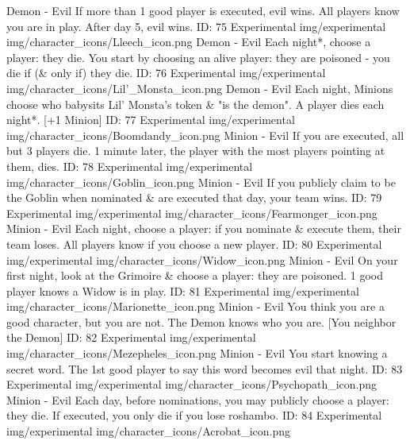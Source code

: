 	{\color{evilcolor}Demon - Evil}
	{If more than 1 good player is executed, evil wins. All players know you are in play. After day 5, evil wins.}        
	{ID: 75}
	{Experimental}
	{img/experimental}
	{img/character_icons/Lleech_icon.png}
	{\color{evilcolor}Demon - Evil}
	{Each night*, choose a player: they die. You start by choosing an alive player: they are poisoned - you die if (\& only if) they die.}        
	{ID: 76}
	{Experimental}
	{img/experimental}
	{img/character_icons/Lil'_Monsta_icon.png}
	{\color{evilcolor}Demon - Evil}
	{Each night, Minions choose who babysits Lil' Monsta's token \& "is the demon". A player dies each night*. [+1 Minion]}        
	{ID: 77}
	{Experimental}
	{img/experimental}
	{img/character_icons/Boomdandy_icon.png}
	{\color{evilcolor}Minion - Evil}
	{If you are executed, all but 3 players die. 1 minute later, the player with the most players pointing at them, dies.}        
	{ID: 78}
	{Experimental}
	{img/experimental}
	{img/character_icons/Goblin_icon.png}
	{\color{evilcolor}Minion - Evil}
	{If you publicly claim to be the Goblin when nominated \& are executed that day, your team wins.}        
	{ID: 79}
	{Experimental}
	{img/experimental}
	{img/character_icons/Fearmonger_icon.png}
	{\color{evilcolor}Minion - Evil}
	{Each night, choose a player: if you nominate \& execute them, their team loses. All players know if you choose a new player.}        
	{ID: 80}
	{Experimental}
	{img/experimental}
	{img/character_icons/Widow_icon.png}
	{\color{evilcolor}Minion - Evil}
	{On your first night, look at the Grimoire \& choose a player: they are poisoned. 1 good player knows a Widow is in play.}        
	{ID: 81}
	{Experimental}
	{img/experimental}
	{img/character_icons/Marionette_icon.png}
	{\color{evilcolor}Minion - Evil}
	{You think you are a good character, but you are not. The Demon knows who you are. [You neighbor the Demon]}        
	{ID: 82}
	{Experimental}
	{img/experimental}
	{img/character_icons/Mezepheles_icon.png}
	{\color{evilcolor}Minion - Evil}
	{You start knowing a secret word. The 1st good player to say this word becomes evil that night.}        
	{ID: 83}
	{Experimental}
	{img/experimental}
	{img/character_icons/Psychopath_icon.png}
	{\color{evilcolor}Minion - Evil}
	{Each day, before nominations, you may publicly choose a player: they die. If executed, you only die if you lose roshambo.}        
	{ID: 84}
	{Experimental}
	{img/experimental}
	{img/character_icons/Acrobat_icon.png}
